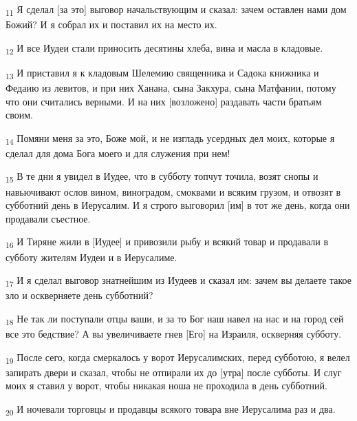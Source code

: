 \begin{tcolorbox}
\textsubscript{11} Я сделал [за это] выговор начальствующим и сказал: зачем оставлен нами дом Божий? И я собрал их и поставил их на место их.
\end{tcolorbox}
\begin{tcolorbox}
\textsubscript{12} И все Иудеи стали приносить десятины хлеба, вина и масла в кладовые.
\end{tcolorbox}
\begin{tcolorbox}
\textsubscript{13} И приставил я к кладовым Шелемию священника и Садока книжника и Федаию из левитов, и при них Ханана, сына Закхура, сына Матфании, потому что они считались верными. И на них [возложено] раздавать части братьям своим.
\end{tcolorbox}
\begin{tcolorbox}
\textsubscript{14} Помяни меня за это, Боже мой, и не изгладь усердных дел моих, которые я сделал для дома Бога моего и для служения при нем!
\end{tcolorbox}
\begin{tcolorbox}
\textsubscript{15} В те дни я увидел в Иудее, что в субботу топчут точила, возят снопы и навьючивают ослов вином, виноградом, смоквами и всяким грузом, и отвозят в субботний день в Иерусалим. И я строго выговорил [им] в тот же день, когда они продавали съестное.
\end{tcolorbox}
\begin{tcolorbox}
\textsubscript{16} И Тиряне жили в [Иудее] и привозили рыбу и всякий товар и продавали в субботу жителям Иудеи и в Иерусалиме.
\end{tcolorbox}
\begin{tcolorbox}
\textsubscript{17} И я сделал выговор знатнейшим из Иудеев и сказал им: зачем вы делаете такое зло и оскверняете день субботний?
\end{tcolorbox}
\begin{tcolorbox}
\textsubscript{18} Не так ли поступали отцы ваши, и за то Бог наш навел на нас и на город сей все это бедствие? А вы увеличиваете гнев [Его] на Израиля, оскверняя субботу.
\end{tcolorbox}
\begin{tcolorbox}
\textsubscript{19} После сего, когда смеркалось у ворот Иерусалимских, перед субботою, я велел запирать двери и сказал, чтобы не отпирали их до [утра] после субботы. И слуг моих я ставил у ворот, чтобы никакая ноша не проходила в день субботний.
\end{tcolorbox}
\begin{tcolorbox}
\textsubscript{20} И ночевали торговцы и продавцы всякого товара вне Иерусалима раз и два.
\end{tcolorbox}

